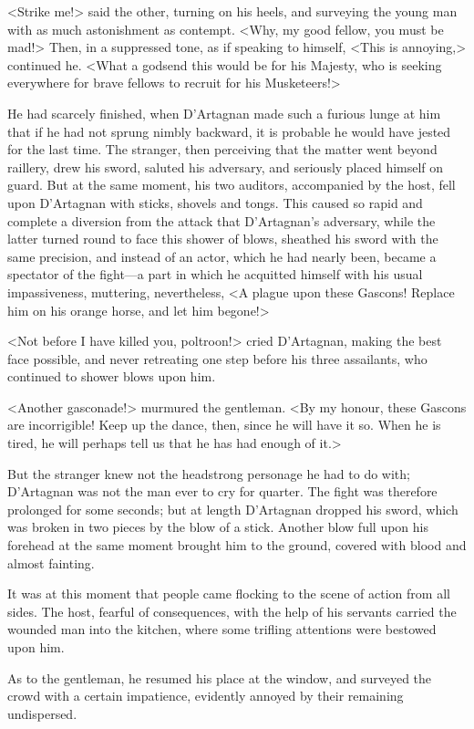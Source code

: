 <Strike me!> said the other, turning on his heels, and surveying the young man with as much astonishment as contempt. <Why, my good fellow, you must be mad!> Then, in a suppressed tone, as if speaking to himself, <This is annoying,> continued he. <What a godsend this would be for his Majesty, who is seeking everywhere for brave fellows to recruit for his Musketeers!> 

He had scarcely finished, when D'Artagnan made such a furious lunge at him that if he had not sprung nimbly backward, it is probable he would have jested for the last time. The stranger, then perceiving that the matter went beyond raillery, drew his sword, saluted his adversary, and seriously placed himself on guard. But at the same moment, his two auditors, accompanied by the host, fell upon D'Artagnan with sticks, shovels and tongs. This caused so rapid and complete a diversion from the attack that D'Artagnan's adversary, while the latter turned round to face this shower of blows, sheathed his sword with the same precision, and instead of an actor, which he had nearly been, became a spectator of the fight—a part in which he acquitted himself with his usual impassiveness, muttering, nevertheless, <A plague upon these Gascons! Replace him on his orange horse, and let him begone!> 

<Not before I have killed you, poltroon!> cried D'Artagnan, making the best face possible, and never retreating one step before his three assailants, who continued to shower blows upon him. 

<Another gasconade!> murmured the gentleman. <By my honour, these Gascons are incorrigible! Keep up the dance, then, since he will have it so. When he is tired, he will perhaps tell us that he has had enough of it.> 

But the stranger knew not the headstrong personage he had to do with; D'Artagnan was not the man ever to cry for quarter. The fight was therefore prolonged for some seconds; but at length D'Artagnan dropped his sword, which was broken in two pieces by the blow of a stick. Another blow full upon his forehead at the same moment brought him to the ground, covered with blood and almost fainting. 

It was at this moment that people came flocking to the scene of action from all sides. The host, fearful of consequences, with the help of his servants carried the wounded man into the kitchen, where some trifling attentions were bestowed upon him. 

As to the gentleman, he resumed his place at the window, and surveyed the crowd with a certain impatience, evidently annoyed by their remaining undispersed. 


